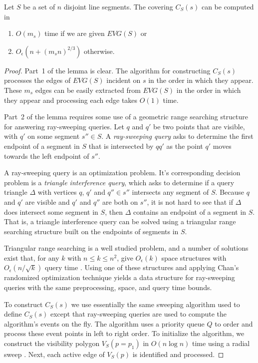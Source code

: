 \documentclass{patmorin}
\newcommand{\EVG}{\mathit{EVG}}
\newcommand{\Oe}{O_\epsilon}
\begin{document}
\begin{lem}
  Let $S$ be a set of $n$ disjoint line segments.
  The covering $C_S(s)$ can be computed in
  \begin{enumerate}
     \item $O(m_s)$ time if we are given $\EVG(S)$ or
     \item $\Oe(n+(m_s n)^{2/3})$ otherwise.
  \end{enumerate}
\end{lem}
\begin{proof}
Part~1 of the lemma is clear. The algorithm for constructing $C_S(s)$
processes the edges of $\EVG(S)$ incident on $s$ in the order in which
they appear.  These $m_s$ edges can be easily extracted from $\EVG(S)$ in
the order in which they appear and processing each edge takes $O(1)$ time.

Part~2 of the lemma requires some use of a geometric range searching
structure for answering ray-sweeping queries.  Let $q$ and $q'$ be two
points that are visible, with $q'$ on some segment $s''\in S$.  A
\emph{ray-sweeping query} asks to determine the first endpoint of a segment
in $S$ that is intersected by $qq'$ as the point $q'$ moves towards the
left endpoint of $s''$.

A ray-sweeping query is an optimization problem.  It's corresponding
decision problem is a \emph{triangle interference query}, which asks to
determine if a query triangle $\Delta$ with vertices $q$, $q'$ and $q''\in
s''$ intersects any segment of $S$.  Because $q$ and $q'$ are visible and
$q'$ and $q''$ are both on $s''$, it is not hard to see that if $\Delta$
does intersect some segment in $S$, then $\Delta$ contains an endpoint of a
segment in $S$.  That is, a triangle interference query can be solved using
a triangular range searching structure built on the endpoints of segments
in $S$.

Triangular range searching is a well studied problem, and a number of
solutions exist that, for any $k$ with $n\le k\le n^2$, give $\Oe(k)$
space structures with $\Oe(n/\sqrt{k})$ query time \cite[Section~4]{ae99}.
Using one of these structures and applying Chan's randomized optimization
technique \cite[Theorem~3.2]{c99} yields a data structure for ray-sweeping
queries with the same preprocessing, space, and query time bounds.

To construct $C_S(s)$ we use essentially the same sweeping algorithm used
to define $C_S(s)$ except that ray-sweeping queries are used to compute
the algorithm's events on the fly.  The algorithm uses a priority queue
$Q$ to order and process these event points in left to right order.
To initialize the algorithm, we construct the visibility polygon
$V_S(p=p_1)$ in $O(n\log n)$ time using a radial sweep \cite{a85,so84}.
Next, each active edge of $V_S(p)$ is identified and processed.


\end{proof}
\end{document}
